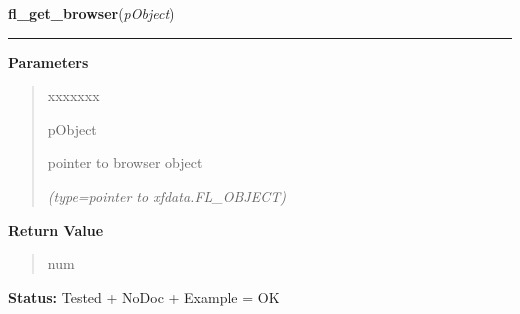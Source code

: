 \hspace{.8\funcindent}\begin{boxedminipage}{\funcwidth}

    \raggedright \textbf{fl\_get\_browser}(\textit{pObject})

    \vspace{-1.5ex}

    \rule{\textwidth}{0.5\fboxrule}
\setlength{\parskip}{2ex}
\setlength{\parskip}{1ex}
      \textbf{Parameters}
      \vspace{-1ex}

      \begin{quote}
        \begin{Ventry}{xxxxxxx}

          \item[pObject]

          pointer to browser object

            {\it (type=pointer to xfdata.FL\_OBJECT)}

        \end{Ventry}

      \end{quote}

      \textbf{Return Value}
    \vspace{-1ex}

      \begin{quote}
      num

      \end{quote}

\textbf{Status:} Tested + NoDoc + Example = OK



    \end{boxedminipage}

    \label{xformslib:library:fl_get_browser_maxline}

    \vspace{0.5ex}

